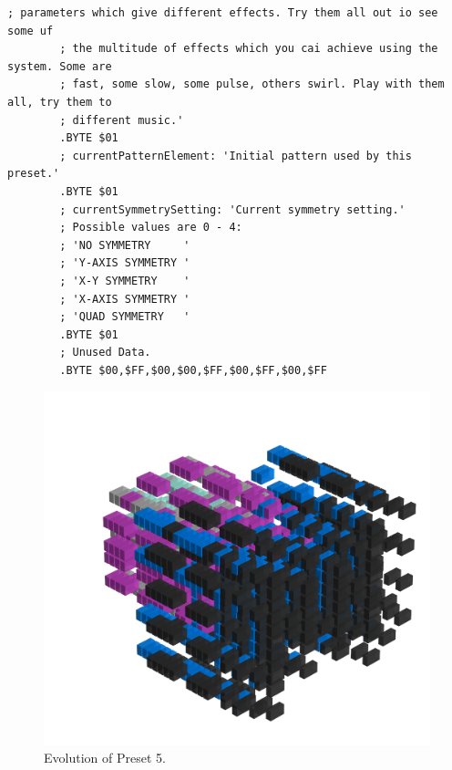\begin{lstlisting}[basicstyle=\ttfamily\tiny,caption=Source code for Preset 4.]
        ; parameters which give different effects. Try them all out io see some uf
        ; the multitude of effects which you cai achieve using the system. Some are
        ; fast, some slow, some pulse, others swirl. Play with them all, try them to
        ; different music.'
        .BYTE $01
        ; currentPatternElement: 'Initial pattern used by this preset.'
        .BYTE $01
        ; currentSymmetrySetting: 'Current symmetry setting.'
        ; Possible values are 0 - 4:
        ; 'NO SYMMETRY     '
        ; 'Y-AXIS SYMMETRY '
        ; 'X-Y SYMMETRY    '
        ; 'X-AXIS SYMMETRY '
        ; 'QUAD SYMMETRY   '
        .BYTE $01
        ; Unused Data.
        .BYTE $00,$FF,$00,$00,$FF,$00,$FF,$00,$FF
\end{lstlisting}


\clearpage                                                                 
\begin{figure}[H]                                                          
    \centering                                                             
    \begin{adjustbox}{width=14cm,center}                                   
      \includegraphics[width=14cm]{src/presets/pattern5-45.png}%
    \end{adjustbox}                                                        
\caption{Evolution of Preset 5.}                                           
\end{figure}                                                               
\clearpage                                                                 
                                                                           
